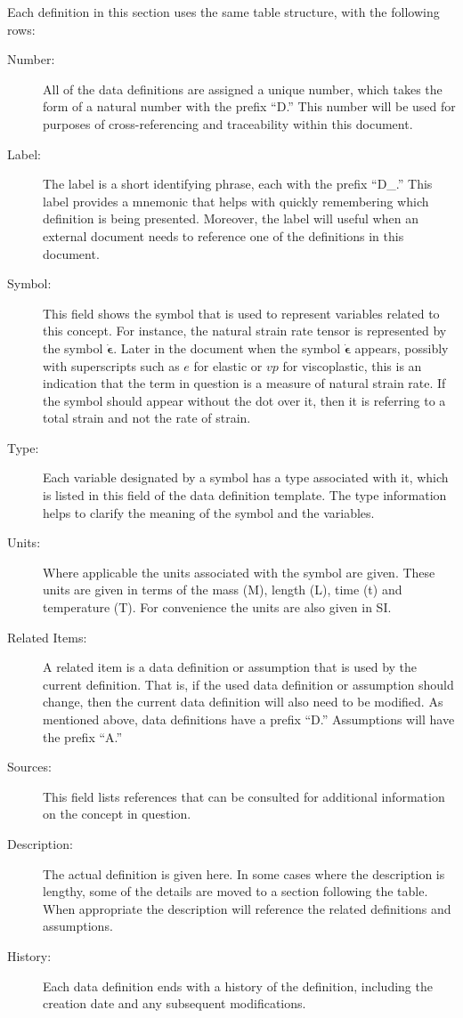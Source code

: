 \documentclass{article}
\begin{document}
Each definition in this section uses the same table structure, with the following rows:

\begin{description}

\item [Number:] All of the data definitions are assigned a unique number, which
  takes the form of a natural number with the prefix ``D.''  This number will be
  used for purposes of cross-referencing and traceability within this document.
\item [Label:] The label is a short identifying phrase, each with the prefix
  ``D\_.''  This label provides a mnemonic that helps with quickly remembering
  which definition is being presented.  Moreover, the label will useful when an
  external document needs to reference one of the definitions in this document.
\item [Symbol:] This field shows the symbol that is used to represent variables
  related to this concept.  For instance, the natural strain rate tensor is
  represented by the symbol $\dot{\bm{\epsilon}}$.  Later in the document when
  the symbol $\dot{\bm{\epsilon}}$ appears, possibly with superscripts such as
  $e$ for elastic or $vp$ for viscoplastic, this is an indication that the term
  in question is a measure of natural strain rate.  If the symbol should appear
  without the dot over it, then it is referring to a total strain and not the
  rate of strain.
\item [Type:] Each variable designated by a symbol has a type associated with
  it, which is listed in this field of the data definition template.  The type
  information helps to clarify the meaning of the symbol and the variables.
\item [Units:] Where applicable the units associated with the symbol are given.
  These units are given in terms of the mass (M), length (L), time (t) and
  temperature (T).  For convenience the units are also given in SI.
\item [Related Items:] A related item is a data definition or assumption that is
  used by the current definition.  That is, if the used data definition or
  assumption should change, then the current data definition will also need to
  be modified.  As mentioned above, data definitions have a prefix ``D.''
  Assumptions will have the prefix ``A.''
\item [Sources:] This field lists references that can be consulted for
  additional information on the concept in question.
\item [Description:] The actual definition is given here.  In some cases where
  the description is lengthy, some of the details are moved to a section
  following the table.  When appropriate the description will reference the
  related definitions and assumptions.
\item [History:] Each data definition ends with a history of the definition,
  including the creation date and any subsequent modifications.

\end{description}
\end{document}
